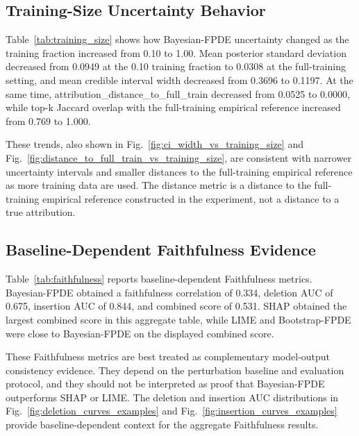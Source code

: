 \subsection{Training-Size Uncertainty Behavior}

Table~\ref{tab:training_size} shows how Bayesian-FPDE uncertainty changed as the training fraction increased from 0.10 to 1.00. Mean posterior standard deviation decreased from 0.0949 at the 0.10 training fraction to 0.0308 at the full-training setting, and mean credible interval width decreased from 0.3696 to 0.1197. At the same time, attribution\_distance\_to\_full\_train decreased from 0.0525 to 0.0000, while top-k Jaccard overlap with the full-training empirical reference increased from 0.769 to 1.000.

These trends, also shown in Fig.~\ref{fig:ci_width_vs_training_size} and Fig.~\ref{fig:distance_to_full_train_vs_training_size}, are consistent with narrower uncertainty intervals and smaller distances to the full-training empirical reference as more training data are used. The distance metric is a distance to the full-training empirical reference constructed in the experiment, not a distance to a true attribution.

\subsection{Baseline-Dependent Faithfulness Evidence}

Table~\ref{tab:faithfulness} reports baseline-dependent Faithfulness metrics. Bayesian-FPDE obtained a faithfulness correlation of 0.334, deletion AUC of 0.675, insertion AUC of 0.844, and combined score of 0.531. SHAP obtained the largest combined score in this aggregate table, while LIME and Bootstrap-FPDE were close to Bayesian-FPDE on the displayed combined score.

These Faithfulness metrics are best treated as complementary model-output consistency evidence. They depend on the perturbation baseline and evaluation protocol, and they should not be interpreted as proof that Bayesian-FPDE outperforms SHAP or LIME. The deletion and insertion AUC distributions in Fig.~\ref{fig:deletion_curves_examples} and Fig.~\ref{fig:insertion_curves_examples} provide baseline-dependent context for the aggregate Faithfulness results.
